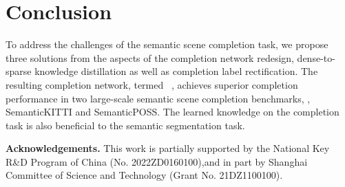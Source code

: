 \documentclass[10pt,twocolumn,letterpaper]{article}
\begin{document}
\section{Conclusion}\label{conclusion}

To address the challenges of the semantic scene completion task, we propose three solutions from the aspects of the completion network redesign, dense-to-sparse knowledge distillation as well as completion label rectification. The resulting completion network, termed \algorithmname~, achieves superior completion performance in two large-scale semantic scene completion benchmarks, \ie, SemanticKITTI and SemanticPOSS. The learned knowledge on the completion task is also beneficial to the semantic segmentation task.

\noindent \textbf{Acknowledgements.} This work is partially supported by the National Key R\&D Program of China (No.
2022ZD0160100),and in part by  Shanghai Committee of Science and Technology (Grant No. 21DZ1100100).

{\small


}

\appendix
\appendixpage
\addappheadtotoc
\end{document}
